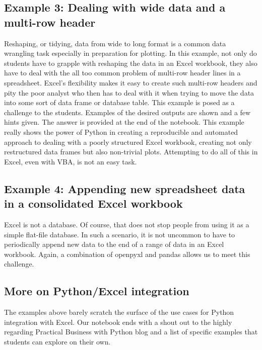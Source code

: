 \documentclass[ited,blindrev]{informs3}              %
\begin{document}
\subsection{Example 3: Dealing with wide data and a multi-row header}

Reshaping, or tidying, data \cite{wickhamTidyData2014} from wide to long format is a common data wrangling task especially in preparation for plotting. In this example, not only do students have to grapple with reshaping the data in an Excel workbook, they also have to deal with the all too common problem of multi-row header lines in a spreadsheet. Excel's flexibility makes it easy to create such multi-row headers and pity the poor analyst who then has to deal with it when trying to move the data into some sort of data frame or database table. This example is posed as a challenge to the students. Examples of the desired outputs are shown and a few hints given. The answer is provided at the end of the notebook. This example really shows the power of Python in creating a reproducible and automated approach to dealing with a poorly structured Excel workbook, creating not only restructured data frames but also non-trivial plots. Attempting to do all of this in Excel, even with VBA, is not an easy task.

\subsection{Example 4: Appending new spreadsheet data in a consolidated Excel workbook}

Excel is not a database. Of course, that does not stop people from using it as a simple flat-file database. In such a scenario, it is not uncommon to have to periodically append new data to the end of a range of data in an Excel workbook. Again, a combination of openpyxl and pandas allows us to meet this challenge.

\subsection{More on Python/Excel integration}

The examples above barely scratch the surface of the use cases for Python integration with Excel. Our notebook ends with a shout out to the highly regarding Practical Business with Python blog and a list of specific examples that students can explore on their own.
\end{document}
